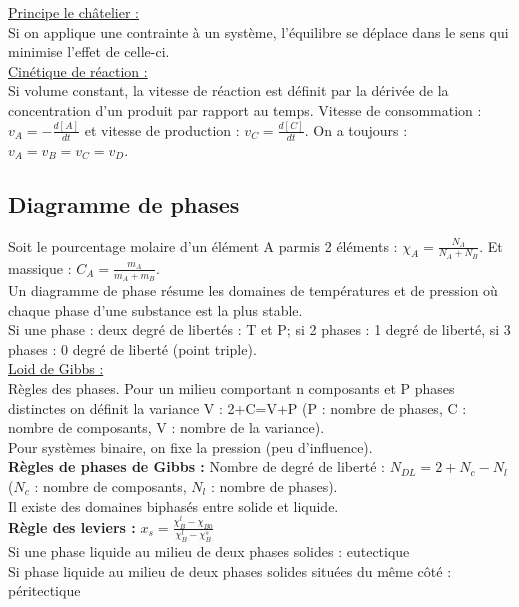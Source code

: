 \documentclass[../main.tex]{subfiles}
\begin{document}
\quad \underline{Principe le châtelier :}\\
Si on applique une contrainte à un système, l'équilibre se déplace dans le sens qui minimise l'effet de celle-ci.\\

\quad \underline{Cinétique de réaction :}\\
Si volume constant, la vitesse de réaction est définit par la dérivée de la concentration d'un produit par rapport au temps. Vitesse de consommation : $v_A = -\frac{d[A]}{dt}$ et vitesse de production : $v_C = \frac{d[C]}{dt}$. On a toujours : $v_A = v_B = v_C = v_D$.\\

\subsection{Diagramme de phases}
Soit le pourcentage molaire d'un élément A parmis 2 éléments : $\chi_A = \frac{N_A}{N_A +N_B}$. Et massique : $C_A = \frac{m_A}{m_A+m_B}$.\\

Un diagramme de phase résume les domaines de températures et de pression où chaque phase d'une substance est la plus stable.\\
Si une phase : deux degré de libertés : T et P; si 2 phases : 1 degré de liberté, si 3 phases : 0 degré de liberté (point triple).\\

\quad \underline{Loid de Gibbs :}\\
Règles des phases. Pour un milieu comportant n composants et P phases distinctes on définit la variance V : 2+C=V+P (P : nombre de phases, C : nombre de composants, V : nombre de la variance).\\
Pour systèmes binaire, on fixe la pression (peu d'influence). \\
\textbf{Règles de phases de Gibbs :} Nombre de degré de liberté : $N_{DL} = 2+N_c-N_l$ ($N_c$ : nombre de composants, $N_l$ : nombre de phases).\\
Il existe des domaines biphasés entre solide et liquide. \\
\textbf{Règle des leviers :} $x_s = \frac{\chi_B^l-\chi_{B0}}{\chi_B^l-\chi_B^s}$\\

Si une phase liquide au milieu de deux phases solides : eutectique\\
Si phase liquide au milieu de deux phases solides situées du même côté : péritectique\\
\end{document}
